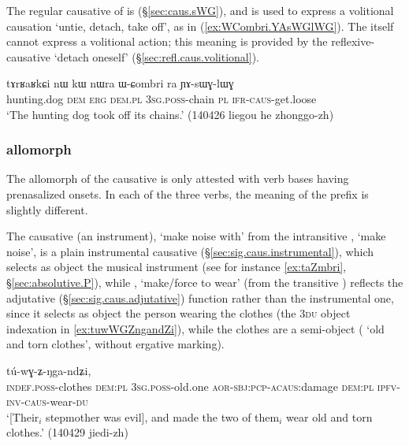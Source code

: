 The regular causative of  is  (§\ref{sec:caus.sWG}), and is used to express a volitional causation `untie, detach, take off', as in (\ref{ex:WCombri.YAsWGlWG}). The  itself cannot express a volitional action; this meaning is provided by the reflexive-causative  `detach oneself' (§\ref{sec:refl.caus.volitional}).

\begin{exe}
\ex \label{ex:WCombri.YAsWGlWG}
\gll tɤrʁaʁkɕi nɯ kɯ nɯra ɯ-ɕombri ra ɲɤ-sɯɣ-lɯɣ \\
hunting.dog \textsc{dem} \textsc{erg} \textsc{dem}.\textsc{pl} \textsc{3sg}.\textsc{poss}-chain \textsc{pl} \textsc{ifr}-\textsc{caus}-get.loose \\
\glt `The hunting dog took off its chains.' (140426 liegou he zhonggo-zh)
\end{exe}


\subsubsection{ allomorph} \label{sec:caus.Z}
The  allomorph of the causative is only attested with verb bases having prenasalized onsets. In each of the three verbs, the meaning of the prefix is slightly different.
 
The causative  (an instrument), `make noise with' from the intransitive , `make noise', is a plain instrumental causative (§\ref{sec:sig.caus.instrumental}), which selects as object the musical instrument (see for instance \ref{ex:taZmbri}, §\ref{sec:absolutive.P}), while , `make/force to wear'  (from the transitive ) reflects the  adjutative  (§\ref{sec:sig.caus.adjutative}) function rather than the instrumental one, since it selects as object the person wearing the clothes (the \textsc{3du} object indexation in \ref{ex:tuwWGZngandZi}), while the clothes are a semi-object ( `old and torn clothes', without ergative marking).

\begin{exe}
\ex \label{ex:tuwWGZngandZi}
 tú-wɣ-ʑ-ŋga-ndʑi, \\
\textsc{indef}.\textsc{poss}-clothes \textsc{dem}:\textsc{pl} \textsc{3sg}.\textsc{poss}-old.one \textsc{aor}-\textsc{sbj}:\textsc{pcp}-\textsc{acaus}:damage \textsc{dem}:\textsc{pl} \textsc{ipfv}-\textsc{inv}-\textsc{caus}-wear-\textsc{du} \\
\glt `[Their$_i$ stepmother was evil], and made the two of them$_i$ wear old and torn clothes.' (140429 jiedi-zh)
\end{exe}

